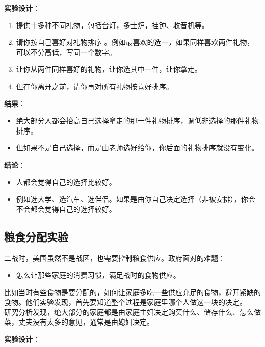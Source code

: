 \textbf{实验设计}：

\begin{enumerate}
\tightlist
\item
  提供十多种不同礼物，包括台灯，多士炉，挂钟、收音机等。
\item
  请你按自己喜好对礼物排序
  。例如最喜欢的选一，如果同样喜欢两件礼物，可以不分高低，写同一个数字。
\item
  让你从两件同样喜好的礼物，让你选其中一件，让你拿走。
\item
  但在你离开之前，请你再对所有礼物按喜好排序。
\end{enumerate}

\textbf{结果}：

\begin{itemize}
\tightlist
\item
  绝大部分人都会抬高自己选择拿走的那一件礼物排序，调低非选择的那件礼物排序。
\item
  但如果不是自己选择，而是由老师选好给你，你后面的礼物排序就没有变化。
\end{itemize}

\textbf{结论}：

\begin{itemize}
\tightlist
\item
  人都会觉得自己的选择比较好。
\item
  例如选大学、选汽车、选伴侣。如果是由你自己决定选择（非被安排），你会不会都会觉得自己的选择较好。
\end{itemize}

\hypertarget{ux7caeux98dfux5206ux914dux5b9eux9a8c}{%
\subsection{粮食分配实验}\label{ux7caeux98dfux5206ux914dux5b9eux9a8c}}

二战时，美国虽然不是战区，也需要控制粮食供应。政府面对的难题：

\begin{itemize}
\tightlist
\item
  怎么让那些家庭的消费习惯，满足战时的食物供应。
\end{itemize}

比如当时有些食物是要分配的，如何让家庭多吃一些供应充足的食物，避开紧缺的食物。他们实验发现，首先要知道整个过程是家庭里哪个人做这一块的决定。\\
研究分析发现，绝大部分的家庭都是由家庭主妇决定购买什么、储存什么、怎么做菜，丈夫没有太多的意见，通常是由媳妇决定。

\textbf{实验设计}：

